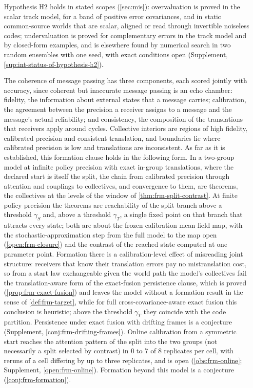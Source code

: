 Hypothesis H2 holds in stated scopes (\cref{sec:mis}): overvaluation is proved in the scalar track model, for a band of positive error covariances, and in static common-source worlds that are scalar, aligned or read through invertible noiseless codes; undervaluation is proved for complementary errors in the track model and by closed-form examples, and is elsewhere found by numerical search in two random ensembles with one seed, with exact conditions open (Supplement, \cref{sup:int-status-of-hypothesis-h2}).

\begin{hypothesis}\label{hyp:int-h3}
The coherence of message passing has three components, each scored jointly with accuracy, since coherent but inaccurate message passing is an echo chamber: fidelity, the information about external states that a message carries; calibration, the agreement between the precision a receiver assigns to a message and the message's actual reliability; and consistency, the composition of the translations that receivers apply around cycles. Collective interiors are regions of high fidelity, calibrated precision and consistent translation, and boundaries lie where calibrated precision is low and translations are inconsistent. As far as it is established, this formation clause holds in the following form. In a two-group model at infinite policy precision with exact in-group translations, where the declared start is itself the split, the chain from calibrated precision through attention and couplings to collectives, and convergence to them, are theorems, the collectives at the levels of the window of \cref{thm:frm-split-contrast}. At finite policy precision the theorems are reachability of the split branch above a threshold $\gamma_S$ and, above a threshold $\gamma_T$, a single fixed point on that branch that attracts every state; both are about the frozen-calibration mean-field map, with the stochastic-approximation step from the full model to the map open (\cref{open:frm-closure}) and the contrast of the reached state computed at one parameter point. Formation there is a calibration-level effect of misreading joint structure: receivers that know their translation errors pay no mistranslation cost, so from a start law exchangeable given the world path the model's collectives fail the translation-aware form of the exact-fusion persistence clause, which is proved (\cref{prop:frm-exact-fusion}) and leaves the model without a formation result in the sense of \cref{def:frm-target}, while for full cross-covariance-aware exact fusion this conclusion is heuristic; above the threshold $\gamma_T$ they coincide with the code partition. Persistence under exact fusion with drifting frames is a conjecture (Supplement, \cref{conj:frm-drifting-frames}). Online calibration from a symmetric start reaches the attention pattern of the split into the two groups (not necessarily a split selected by contrast) in 0 to 7 of 8 replicates per cell, with reruns of a cell differing by up to three replicates, and is open (\cref{obs:frm-online}; Supplement, \cref{open:frm-online}). Formation beyond this model is a conjecture (\cref{conj:frm-formation}).
\end{hypothesis}
